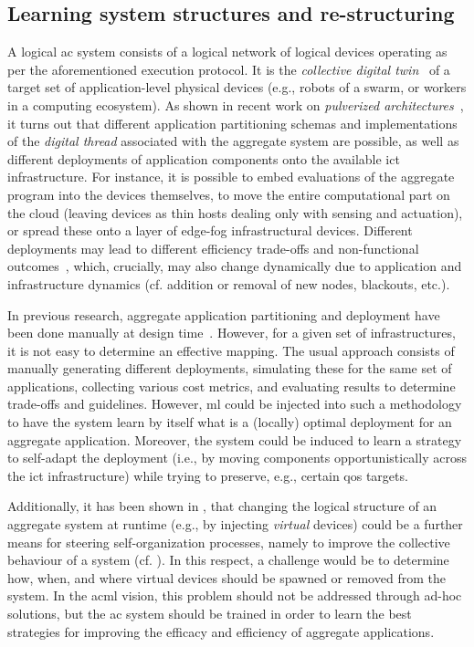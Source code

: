 \subsection{Learning system structures and re-structuring}
A logical \ac{ac} system 
 consists of a logical network
 of logical devices
 operating as per the aforementioned execution protocol.
%
It is the \emph{collective digital twin}~\cite{casadei2022applsci}
 of a target set of application-level physical devices (e.g., robots of a swarm, or workers in a computing ecosystem).
%
As shown in recent work on \emph{pulverized architectures}~\cite{DBLP:journals/fi/CasadeiPPVW20},
 it turns out that different application partitioning schemas and implementations of the \emph{digital thread} associated with the aggregate system are possible,
 as well as different deployments
 of application components
 onto the available \ac{ict} infrastructure.
%
%
For instance,
 it is possible to embed evaluations of the aggregate program into the devices themselves,
 to move the entire computational part on the cloud (leaving devices as thin hosts dealing only with sensing and actuation),
 or spread these onto a layer of edge-fog infrastructural devices.
%
Different deployments 
 may lead to different efficiency trade-offs
 and non-functional outcomes~\cite{DBLP:journals/fi/CasadeiPPVW20,casadei2022applsci},
 which, crucially, may also change dynamically 
 due to application and infrastructure dynamics
 (cf. addition or removal of new nodes, blackouts, etc.).
 

In previous research, aggregate application partitioning and deployment have been done manually at design time~\cite{DBLP:journals/fi/CasadeiPPVW20}.
%
However, for a given set of infrastructures, it is not easy to determine an effective mapping.
%
The usual approach consists of manually generating different deployments,
 simulating these for the same set of applications,
 collecting various cost metrics,
 and evaluating results to determine trade-offs and guidelines.
%
However, \ac{ml} could be injected into 
 such a methodology
 to have the system learn by itself what is a
 (locally) optimal deployment for an aggregate application.
% 
Moreover, the system could be induced to learn a strategy to self-adapt the deployment (i.e., by moving components opportunistically across the \ac{ict} infrastructure) 
 while trying to preserve, e.g., certain \ac{qos} targets.
 
Additionally,
 it has been shown in \cite{casadei2022applsci},
 that changing the logical structure of an aggregate system at runtime
 (e.g., by injecting \emph{virtual} devices)
 could be a further means 
 for steering self-organization processes,
 namely to improve the collective behaviour of a system (cf. \cite{DBLP:journals/jnca/LiS11}).
%
In this respect,
 a challenge would be to determine
 how, when, and where 
 virtual devices
 should be spawned or removed
 from the system.
%
In the \ac{acml} vision,
 this problem should not be addressed
 through ad-hoc solutions,
 but the \ac{ac} system should be trained
 in order to learn the best strategies
 for improving the efficacy and efficiency
 of aggregate applications.


